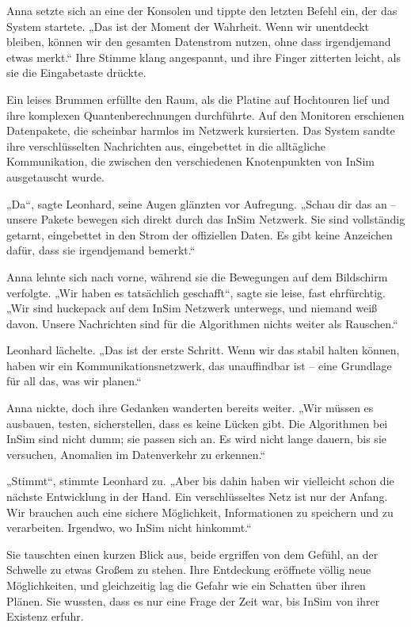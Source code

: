\documentclass[
]{article}
\begin{document}
Anna setzte sich an eine der Konsolen und tippte den letzten Befehl ein,
der das System startete. „Das ist der Moment der Wahrheit. Wenn wir
unentdeckt bleiben, können wir den gesamten Datenstrom nutzen, ohne dass
irgendjemand etwas merkt.`` Ihre Stimme klang angespannt, und ihre
Finger zitterten leicht, als sie die Eingabetaste drückte.

Ein leises Brummen erfüllte den Raum, als die Platine auf Hochtouren
lief und ihre komplexen Quantenberechnungen durchführte. Auf den
Monitoren erschienen Datenpakete, die scheinbar harmlos im Netzwerk
kursierten. Das System sandte ihre verschlüsselten Nachrichten aus,
eingebettet in die alltägliche Kommunikation, die zwischen den
verschiedenen Knotenpunkten von InSim ausgetauscht wurde.

„Da``, sagte Leonhard, seine Augen glänzten vor Aufregung. „Schau dir
das an -- unsere Pakete bewegen sich direkt durch das InSim Netzwerk.
Sie sind vollständig getarnt, eingebettet in den Strom der offiziellen
Daten. Es gibt keine Anzeichen dafür, dass sie irgendjemand bemerkt.``

Anna lehnte sich nach vorne, während sie die Bewegungen auf dem
Bildschirm verfolgte. „Wir haben es tatsächlich geschafft``, sagte sie
leise, fast ehrfürchtig. „Wir sind huckepack auf dem InSim Netzwerk
unterwegs, und niemand weiß davon. Unsere Nachrichten sind für die
Algorithmen nichts weiter als Rauschen.``

Leonhard lächelte. „Das ist der erste Schritt. Wenn wir das stabil
halten können, haben wir ein Kommunikationsnetzwerk, das unauffindbar
ist -- eine Grundlage für all das, was wir planen.``

Anna nickte, doch ihre Gedanken wanderten bereits weiter. „Wir müssen es
ausbauen, testen, sicherstellen, dass es keine Lücken gibt. Die
Algorithmen bei InSim sind nicht dumm; sie passen sich an. Es wird nicht
lange dauern, bis sie versuchen, Anomalien im Datenverkehr zu
erkennen.``

„Stimmt``, stimmte Leonhard zu. „Aber bis dahin haben wir vielleicht
schon die nächste Entwicklung in der Hand. Ein verschlüsseltes Netz ist
nur der Anfang. Wir brauchen auch eine sichere Möglichkeit,
Informationen zu speichern und zu verarbeiten. Irgendwo, wo InSim nicht
hinkommt.``

Sie tauschten einen kurzen Blick aus, beide ergriffen von dem Gefühl, an
der Schwelle zu etwas Großem zu stehen. Ihre Entdeckung eröffnete völlig
neue Möglichkeiten, und gleichzeitig lag die Gefahr wie ein Schatten
über ihren Plänen. Sie wussten, dass es nur eine Frage der Zeit war, bis
InSim von ihrer Existenz erfuhr.
\end{document}

